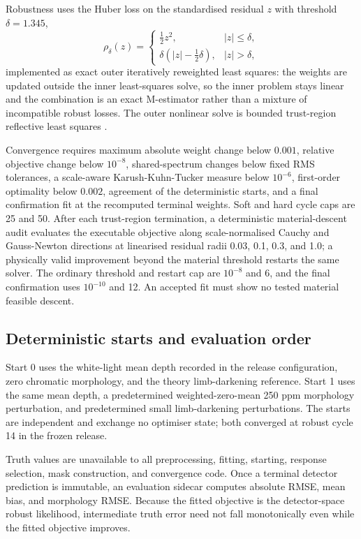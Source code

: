 Robustness uses the Huber loss \citep{Huber1964} on the standardised
residual $z$ with threshold $\delta=1.345$,
\begin{equation}
 \rho_{\delta}(z)=
 \begin{cases}
  \tfrac{1}{2}z^2, & |z|\leq\delta,\\
  \delta\left(|z|-\tfrac{1}{2}\delta\right), & |z|>\delta,
 \end{cases}
\end{equation}
implemented as exact outer iteratively reweighted least squares: the
weights are updated outside the inner least-squares solve, so the inner
problem stays linear and the combination is an exact M-estimator rather
than a mixture of incompatible robust losses. The outer nonlinear solve is
bounded trust-region reflective least squares
\citep{BranchColemanLi1999}.

Convergence requires maximum absolute weight change below $0.001$,
relative objective change below $10^{-8}$, shared-spectrum changes below
fixed RMS tolerances, a scale-aware Karush-Kuhn-Tucker measure below
$10^{-6}$, first-order optimality below $0.002$, agreement of the
deterministic starts, and a final confirmation fit at the recomputed
terminal weights. Soft and hard cycle caps are 25 and 50. After each
trust-region termination, a deterministic material-descent audit evaluates
the executable objective along scale-normalised Cauchy and Gauss-Newton
directions at linearised residual radii 0.03, 0.1, 0.3, and 1.0; a
physically valid improvement beyond the material threshold restarts the
same solver. The ordinary threshold and restart cap are $10^{-8}$ and 6,
and the final confirmation uses $10^{-10}$ and 12. An accepted fit must
show no tested material feasible descent.

\subsection{Deterministic starts and evaluation order}

Start 0 uses the white-light mean depth recorded in the release
configuration, zero chromatic morphology, and the theory limb-darkening
reference. Start 1 uses the same mean depth,
a predetermined weighted-zero-mean 250 ppm morphology perturbation, and
predetermined small limb-darkening perturbations. The starts are
independent and exchange no optimiser state; both converged at robust
cycle 14 in the frozen release.

Truth values are unavailable to all preprocessing, fitting, starting,
response selection, mask construction, and convergence code. Once a
terminal detector prediction is immutable, an evaluation sidecar computes
absolute RMSE, mean bias, and morphology RMSE. Because the fitted
objective is the detector-space robust likelihood, intermediate truth
error need not fall monotonically even while the fitted objective
improves.

